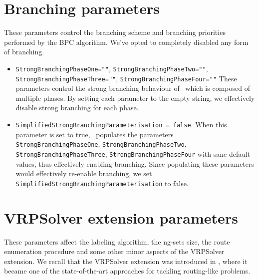 \section{Branching parameters}
These parameters control the branching scheme and branching priorities performed by the BPC algorithm.
We've opted to completely disabled any form of branching.

\begin{itemize}
	\item \texttt{StrongBranchingPhaseOne=""}, \texttt{StrongBranchingPhaseTwo=""}, \texttt{StrongBranchingPhaseThree=""}, \texttt{StrongBranchingPhaseFour=""}
	      These parameters control the strong branching behaviour of \bapcod\, which is composed of multiple phases.
	      By setting each parameter to the empty string, we effectively disable strong branching for each phase.
	\item \texttt{SimplifiedStrongBranchingParameterisation = false}.
	      When this parameter is set to true, \bapcod\ populates the parameters \texttt{StrongBranchingPhaseOne}, \texttt{StrongBranchingPhaseTwo}, \texttt{StrongBranchingPhaseThree}, \texttt{StrongBranchingPhaseFour}
	      with sane default values, thus effectively enabling branching.
	      Since populating these parameters would effectively re-enable branching, we set \texttt{SimplifiedStrongBranchingParameterisation} to false.
\end{itemize}

\section{VRPSolver extension parameters}

These parameters affect the labeling algorithm, the ng-sets size,
the route enumeration procedure and some other minor aspects of the VRPSolver extension.
We recall that the VRPSolver extension was introduced in \textcite{pessoa2020a},
where it became one of the state-of-the-art approaches for tackling routing-like problems.


